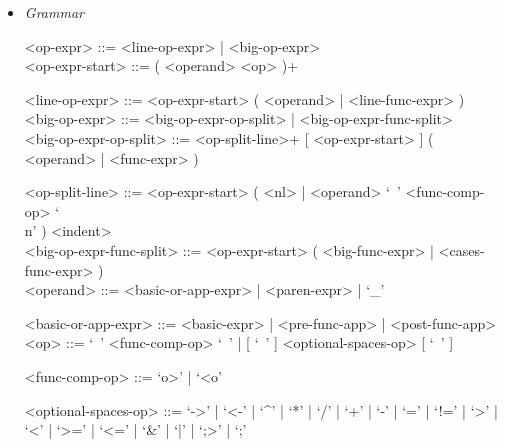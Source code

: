 \documentclass{article}
\begin{document}
\begin{itemize}
\begin{verbatim}
"Hello, I'm a big string that's going to contain multiple values from " +
"inside the imaginary program that I'm a part of. Here they are:\n" +
"value1 = " + value1 + ", value2 = " + value2 + ", value3 = " + value3 + 
", value4 = " + value4 + ", value5 = " + value5
\end{verbatim}

\textbf{Description}

It is possible to stretch a (big) operator expression over multiple lines.
In that case:
\begin{itemize}
\item
The operator expression must split in a new line after an operator (not an
argument).

\item
Every line after the first must be indented so that in begins at the column 
where the first line of the operator expression begun.

\item
The precise indentation rules are described in the section
"Indentation System" \ref{subsubsec:indsys}.
\end{itemize}

\item \textit{Grammar}
\begin{grammar}
<op-expr> ::= <line-op-expr> | <big-op-expr>
\\

<op-expr-start> ::= ( <operand> <op> )+

<line-op-expr> ::= <op-expr-start> ( <operand> | <line-func-expr> )
\\

<big-op-expr> ::= 
<big-op-expr-op-split> | <big-op-expr-func-split>
\\

<big-op-expr-op-split> ::= 
<op-split-line>+ [ <op-expr-start> ] ( <operand> | <func-expr> )

<op-split-line> ::=
<op-expr-start> ( <nl> | <operand> `\ ' <func-comp-op> `\\n' ) <indent> 
\\

<big-op-expr-func-split> ::= <op-expr-start> ( <big-func-expr> | <cases-func-expr> )
\\

<operand> ::= <basic-or-app-expr> | <paren-expr> | `_'

<basic-or-app-expr> ::= <basic-expr> | <pre-func-app> | <post-func-app>
\\

<op> ::= `\ ' <func-comp-op> `\ ' | [ `\ ' ] <optional-spaces-op> [ `\ ' ]

<func-comp-op> ::= `o>' | `<o'

<optional-spaces-op> ::= 
`->' | `<-' | `^' | `*' | `/' | `+' | `-' | `=' | `!=' | `>' | `<' | `>=' | `<=' |
`\&' | `|' | `;>' | `;'
\end{grammar}
\end{itemize}
\end{document}
